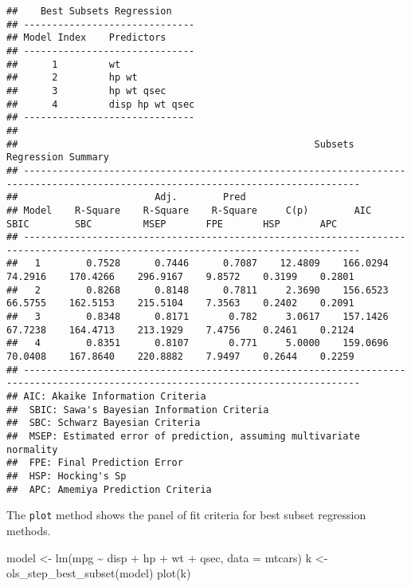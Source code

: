 \documentclass[
]{article}
\newenvironment{Shaded}{\begin{snugshade}}{\end{snugshade}}
\newcommand{\AttributeTok}[1]{\textcolor[rgb]{0.77,0.63,0.00}{#1}}
\newcommand{\FunctionTok}[1]{\textcolor[rgb]{0.00,0.00,0.00}{#1}}
\newcommand{\NormalTok}[1]{#1}
\newcommand{\OtherTok}[1]{\textcolor[rgb]{0.56,0.35,0.01}{#1}}
\newcommand{\SpecialCharTok}[1]{\textcolor[rgb]{0.00,0.00,0.00}{#1}}
\begin{document}
\begin{verbatim}
##    Best Subsets Regression    
## ------------------------------
## Model Index    Predictors
## ------------------------------
##      1         wt              
##      2         hp wt           
##      3         hp wt qsec      
##      4         disp hp wt qsec 
## ------------------------------
## 
##                                                    Subsets Regression Summary                                                    
## ---------------------------------------------------------------------------------------------------------------------------------
##                        Adj.        Pred                                                                                           
## Model    R-Square    R-Square    R-Square     C(p)        AIC        SBIC        SBC         MSEP       FPE       HSP       APC  
## ---------------------------------------------------------------------------------------------------------------------------------
##   1        0.7528      0.7446      0.7087    12.4809    166.0294    74.2916    170.4266    296.9167    9.8572    0.3199    0.2801 
##   2        0.8268      0.8148      0.7811     2.3690    156.6523    66.5755    162.5153    215.5104    7.3563    0.2402    0.2091 
##   3        0.8348      0.8171       0.782     3.0617    157.1426    67.7238    164.4713    213.1929    7.4756    0.2461    0.2124 
##   4        0.8351      0.8107       0.771     5.0000    159.0696    70.0408    167.8640    220.8882    7.9497    0.2644    0.2259 
## ---------------------------------------------------------------------------------------------------------------------------------
## AIC: Akaike Information Criteria 
##  SBIC: Sawa's Bayesian Information Criteria 
##  SBC: Schwarz Bayesian Criteria 
##  MSEP: Estimated error of prediction, assuming multivariate normality 
##  FPE: Final Prediction Error 
##  HSP: Hocking's Sp 
##  APC: Amemiya Prediction Criteria
\end{verbatim}

The \texttt{plot} method shows the panel of fit criteria for best subset
regression methods.

\begin{Shaded}
\begin{Highlighting}[]
\NormalTok{model }\OtherTok{\textless{}{-}} \FunctionTok{lm}\NormalTok{(mpg }\SpecialCharTok{\textasciitilde{}}\NormalTok{ disp }\SpecialCharTok{+}\NormalTok{ hp }\SpecialCharTok{+}\NormalTok{ wt }\SpecialCharTok{+}\NormalTok{ qsec, }\AttributeTok{data =}\NormalTok{ mtcars)}
\NormalTok{k }\OtherTok{\textless{}{-}} \FunctionTok{ols\_step\_best\_subset}\NormalTok{(model)}
\FunctionTok{plot}\NormalTok{(k)}
\end{Highlighting}
\end{Shaded}
\end{document}
